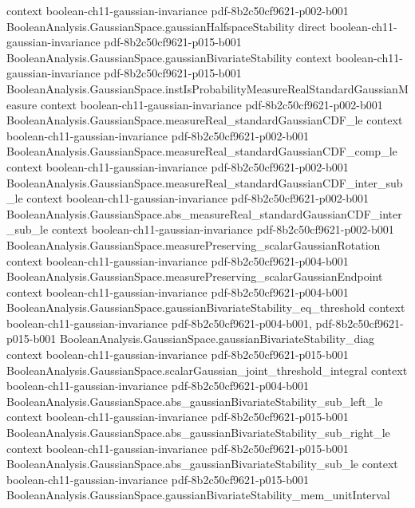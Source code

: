 \begin{theorem}
  {context}
  {boolean-ch11-gaussian-invariance}
  {pdf-8b2c50cf9621-p002-b001}
\proofstep
  {BooleanAnalysis.GaussianSpace.gaussianHalfspaceStability}
  {direct}
  {boolean-ch11-gaussian-invariance}
  {pdf-8b2c50cf9621-p015-b001}
\proofstep
  {BooleanAnalysis.GaussianSpace.gaussianBivariateStability}
  {context}
  {boolean-ch11-gaussian-invariance}
  {pdf-8b2c50cf9621-p015-b001}
\proofstep
  {BooleanAnalysis.GaussianSpace.instIsProbabilityMeasureRealStandardGaussianMeasure}
  {context}
  {boolean-ch11-gaussian-invariance}
  {pdf-8b2c50cf9621-p002-b001}
\proofstep
  {BooleanAnalysis.GaussianSpace.measureReal_standardGaussianCDF_le}
  {context}
  {boolean-ch11-gaussian-invariance}
  {pdf-8b2c50cf9621-p002-b001}
\proofstep
  {BooleanAnalysis.GaussianSpace.measureReal_standardGaussianCDF_comp_le}
  {context}
  {boolean-ch11-gaussian-invariance}
  {pdf-8b2c50cf9621-p002-b001}
\proofstep
  {BooleanAnalysis.GaussianSpace.measureReal_standardGaussianCDF_inter_sub_le}
  {context}
  {boolean-ch11-gaussian-invariance}
  {pdf-8b2c50cf9621-p002-b001}
\proofstep
  {BooleanAnalysis.GaussianSpace.abs_measureReal_standardGaussianCDF_inter_sub_le}
  {context}
  {boolean-ch11-gaussian-invariance}
  {pdf-8b2c50cf9621-p002-b001}
\proofstep
  {BooleanAnalysis.GaussianSpace.measurePreserving_scalarGaussianRotation}
  {context}
  {boolean-ch11-gaussian-invariance}
  {pdf-8b2c50cf9621-p004-b001}
\proofstep
  {BooleanAnalysis.GaussianSpace.measurePreserving_scalarGaussianEndpoint}
  {context}
  {boolean-ch11-gaussian-invariance}
  {pdf-8b2c50cf9621-p004-b001}
\proofstep
  {BooleanAnalysis.GaussianSpace.gaussianBivariateStability_eq_threshold}
  {context}
  {boolean-ch11-gaussian-invariance}
  {pdf-8b2c50cf9621-p004-b001,
    pdf-8b2c50cf9621-p015-b001}
\proofstep
  {BooleanAnalysis.GaussianSpace.gaussianBivariateStability_diag}
  {context}
  {boolean-ch11-gaussian-invariance}
  {pdf-8b2c50cf9621-p015-b001}
\proofstep
  {BooleanAnalysis.GaussianSpace.scalarGaussian_joint_threshold_integral}
  {context}
  {boolean-ch11-gaussian-invariance}
  {pdf-8b2c50cf9621-p004-b001}
\proofstep
  {BooleanAnalysis.GaussianSpace.abs_gaussianBivariateStability_sub_left_le}
  {context}
  {boolean-ch11-gaussian-invariance}
  {pdf-8b2c50cf9621-p015-b001}
\proofstep
  {BooleanAnalysis.GaussianSpace.abs_gaussianBivariateStability_sub_right_le}
  {context}
  {boolean-ch11-gaussian-invariance}
  {pdf-8b2c50cf9621-p015-b001}
\proofstep
  {BooleanAnalysis.GaussianSpace.abs_gaussianBivariateStability_sub_le}
  {context}
  {boolean-ch11-gaussian-invariance}
  {pdf-8b2c50cf9621-p015-b001}
\proofstep
  {BooleanAnalysis.GaussianSpace.gaussianBivariateStability_mem_unitInterval}

\end{theorem}
